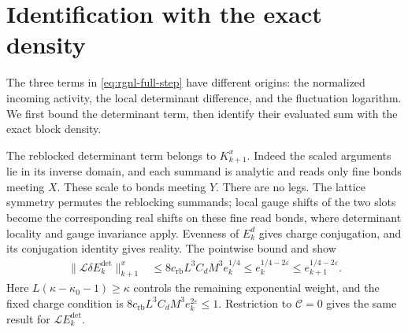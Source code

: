 \section{Identification with the exact density}
\label{subsec:rgnl-current-step}

The three terms in \eqref{eq:rgnl-full-step} have different origins:
the normalized incoming activity, the local determinant difference,
and the fluctuation logarithm. We first bound the determinant term,
then identify their evaluated sum with the exact block density.

The reblocked determinant term belongs to $K_{k+1}^x$.
Indeed the scaled arguments lie in its inverse domain,
and each summand is analytic and reads only fine
bonds meeting $X$. These scale to bonds meeting $Y$.
There are no legs. The lattice symmetry permutes the
reblocking summands; local gauge shifts of the two
slots become the corresponding real shifts on these
fine read bonds, where determinant locality and gauge
invariance apply. Evenness of $E_k^d$ gives charge
conjugation, and its conjugation identity gives reality.
The pointwise bound
 and
 show
\begin{align}
 \|\mathcal L\delta E_k^{\mathrm{det}}\|_{k+1}^x
    &\le8c_{\mathrm{rb}}L^3C_dM^3e_k^{1/4}
      \le e_k^{1/4-2\varepsilon}
      \le e_{k+1}^{1/4-2\varepsilon}.
                                      \label{eq:rgnl-reblocked-determinant}
\end{align}
Here $L(\kappa-\kappa_0-1)\ge\kappa$ controls the
remaining exponential weight, and the fixed charge
condition is
$8c_{\mathrm{rb}}L^3C_dM^3e_k^{2\varepsilon}\le1$.
Restriction to $\mathscr C=0$ gives the same result
for $\mathcal LE_k^{\mathrm{det}}$.

